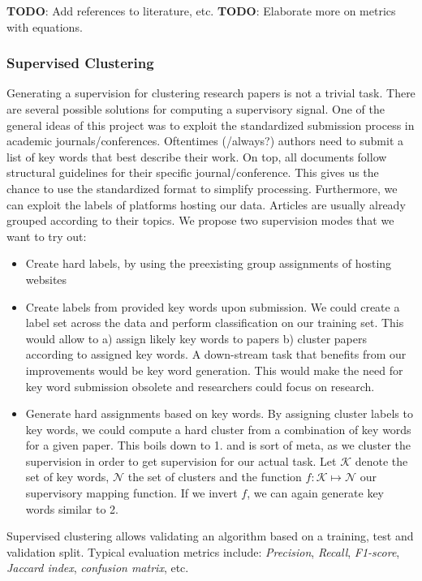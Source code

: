 \textbf{TODO}: Add references to literature, etc.
\textbf{TODO}: Elaborate more on metrics with equations.

\subsubsection{Supervised Clustering}
Generating a supervision for clustering research papers is not a trivial task. There are several possible solutions for computing a supervisory signal. One of the general ideas of this project was to exploit the standardized submission process in academic journals/conferences. Oftentimes (/always?) authors need to submit a list of key words that best describe their work. On top, all documents follow structural guidelines for their specific journal/conference. This gives us the chance to use the standardized format to simplify processing. Furthermore, we can exploit the labels of platforms hosting our data. Articles are usually already grouped according to their topics. We propose two supervision modes that we want to try out: 
\begin{itemize}
	\item Create hard labels, by using the preexisting group assignments of hosting websites
	\item Create labels from provided key words upon submission. We could create a label set across the data and perform classification on our training set. This would allow to a) assign likely key words to papers b) cluster papers according to assigned key words. A down-stream task that benefits from our improvements would be key word generation. This would make the need for key word submission obsolete and researchers could focus on research.
	\item Generate hard assignments based on key words. By assigning cluster labels to key words, we could compute a hard cluster from a combination of key words for a given paper. This boils down to 1. and is sort of meta, as we cluster the supervision in order to get supervision for our actual task. Let $ \mathcal{K} $ denote the set of key words, $ \mathcal{N} $ the set of clusters and the function $ f\colon \mathcal{K} \mapsto \mathcal{N} $ our supervisory mapping function. If we invert $ f $, we can again generate key words similar to 2.
\end{itemize}

Supervised clustering allows validating an algorithm based on a training, test and validation split. Typical evaluation metrics include: \textit{Precision}, \textit{Recall}, \textit{F1-score}, \textit{Jaccard index}, \textit{confusion matrix}, etc.

